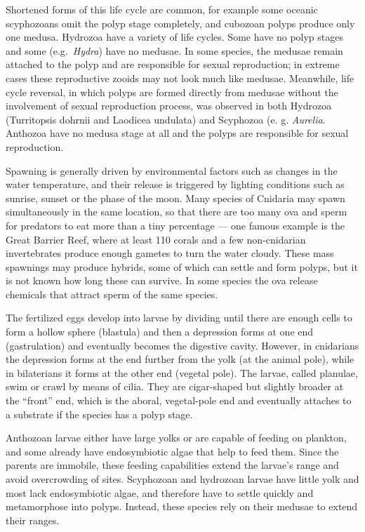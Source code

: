 Shortened forms of this life cycle are common, for example some oceanic
scyphozoans omit the polyp stage completely, and cubozoan polyps produce
only one medusa. Hydrozoa have a variety of life cycles. Some have no
polyp stages and some (e.g.~\emph{Hydra}) have no medusae. In some species, the
medusae remain attached to the polyp and are responsible for sexual
reproduction; in extreme cases these reproductive zooids may not look
much like medusae. Meanwhile, life cycle reversal, in which polyps are
formed directly from medusae without the involvement of sexual
reproduction process, was observed in both Hydrozoa (Turritopsis dohrnii
and Laodicea undulata) and Scyphozoa (e. g. \emph{Aurelia}. Anthozoa have
no medusa stage at all and the polyps are responsible for sexual
reproduction.

Spawning is generally driven by environmental factors such as changes in
the water temperature, and their release is triggered by lighting
conditions such as sunrise, sunset or the phase of the moon. Many
species of Cnidaria may spawn simultaneously in the same location, so
that there are too many ova and sperm for predators to eat more than a
tiny percentage --- one famous example is the Great Barrier Reef, where
at least 110 corals and a few non-cnidarian invertebrates produce enough
gametes to turn the water cloudy. These mass spawnings may produce
hybrids, some of which can settle and form polyps, but it is not known
how long these can survive. In some species the ova release chemicals
that attract sperm of the same species.

The fertilized eggs develop into larvae by dividing until there are
enough cells to form a hollow sphere (blastula) and then a depression
forms at one end (gastrulation) and eventually becomes the digestive
cavity. However, in cnidarians the depression forms at the end further
from the yolk (at the animal pole), while in bilaterians it forms at the
other end (vegetal pole). The larvae, called planulae, swim or crawl by
means of cilia. They are cigar-shaped but slightly broader at the
``front'' end, which is the aboral, vegetal-pole end and eventually
attaches to a substrate if the species has a polyp stage.

Anthozoan larvae either have large yolks or are capable of feeding on
plankton, and some already have endosymbiotic algae that help to feed
them. Since the parents are immobile, these feeding capabilities extend
the larvae's range and avoid overcrowding of sites. Scyphozoan and
hydrozoan larvae have little yolk and most lack endosymbiotic algae, and
therefore have to settle quickly and metamorphose into polyps. Instead,
these species rely on their medusae to extend their ranges.

